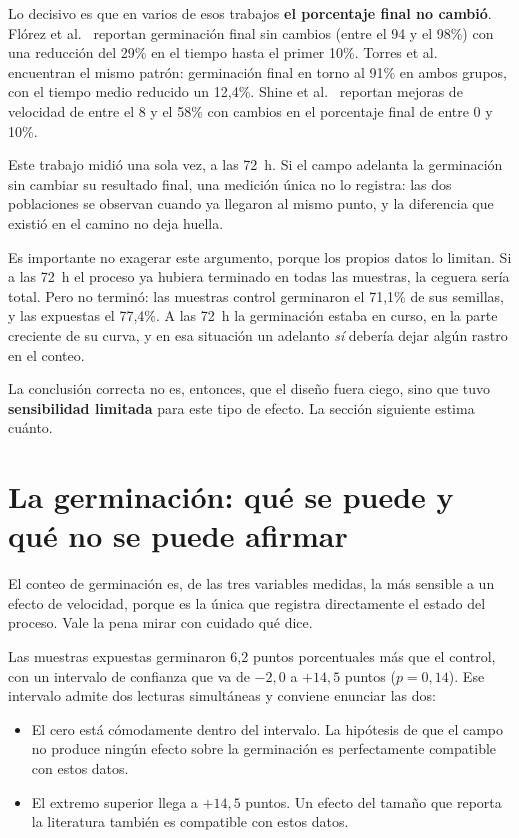 Lo decisivo es que en varios de esos trabajos \textbf{el porcentaje final no cambió}. Flórez et al.~\cite{florez_2007} reportan germinación final sin cambios (entre el 94 y el 98\%) con una reducción del 29\% en el tiempo hasta el primer 10\%. Torres et al.~\cite{torres_2019} encuentran el mismo patrón: germinación final en torno al 91\% en ambos grupos, con el tiempo medio reducido un 12{,}4\%. Shine et al.~\cite{shine_2017} reportan mejoras de velocidad de entre el 8 y el 58\% con cambios en el porcentaje final de entre 0 y 10\%.

Este trabajo midió una sola vez, a las 72~h. Si el campo adelanta la germinación sin cambiar su resultado final, una medición única no lo registra: las dos poblaciones se observan cuando ya llegaron al mismo punto, y la diferencia que existió en el camino no deja huella.

Es importante no exagerar este argumento, porque los propios datos lo limitan. Si a las 72~h el proceso ya hubiera terminado en todas las muestras, la ceguera sería total. Pero no terminó: las muestras control germinaron el 71{,}1\% de sus semillas, y las expuestas el 77{,}4\%. A las 72~h la germinación estaba en curso, en la parte creciente de su curva, y en esa situación un adelanto \emph{sí} debería dejar algún rastro en el conteo.

La conclusión correcta no es, entonces, que el diseño fuera ciego, sino que tuvo \textbf{sensibilidad limitada} para este tipo de efecto. La sección siguiente estima cuánto.

\section{La germinación: qué se puede y qué no se puede afirmar}
\label{sec:disc_germinacion}

El conteo de germinación es, de las tres variables medidas, la más sensible a un efecto de velocidad, porque es la única que registra directamente el estado del proceso. Vale la pena mirar con cuidado qué dice.

Las muestras expuestas germinaron 6{,}2 puntos porcentuales más que el control, con un intervalo de confianza que va de \(-2{,}0\) a \(+14{,}5\) puntos (\(p = 0{,}14\)). Ese intervalo admite dos lecturas simultáneas y conviene enunciar las dos:

\begin{itemize}
    \item El cero está cómodamente dentro del intervalo. La hipótesis de que el campo no produce ningún efecto sobre la germinación es perfectamente compatible con estos datos.
    \item El extremo superior llega a \(+14{,}5\) puntos. Un efecto del tamaño que reporta la literatura también es compatible con estos datos.
\end{itemize}

